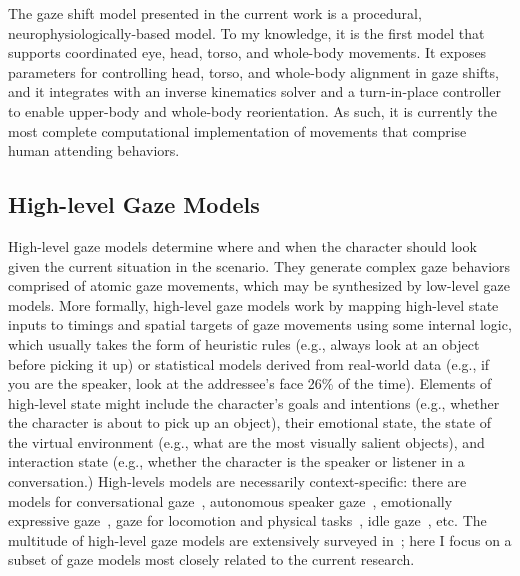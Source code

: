 The gaze shift model presented in the current work is a procedural, neurophysiologically-based model. To my knowledge, it is the first model that supports coordinated eye, head, torso, and whole-body movements. It exposes parameters for controlling head, torso, and whole-body alignment in gaze shifts, and it integrates with an inverse kinematics solver and a turn-in-place controller to enable upper-body and whole-body reorientation. As such, it is currently the most complete computational implementation of movements that comprise human attending behaviors.

\subsection{High-level Gaze Models}

High-level gaze models determine where and when the character should look given the current situation in the scenario. They generate complex gaze behaviors comprised of atomic gaze movements, which may be synthesized by low-level gaze models. More formally, high-level gaze models work by mapping high-level state inputs to timings and spatial targets of gaze movements using some internal logic, which usually takes the form of heuristic rules (e.g., always look at an object before picking it up) or statistical models derived from real-world data (e.g., if you are the speaker, look at the addressee's face 26\% of the time). Elements of high-level state might include the character's goals and intentions (e.g., whether the character is about to pick up an object), their emotional state, the state of the virtual environment (e.g., what are the most visually salient objects), and interaction state (e.g., whether the character is the speaker or listener in a conversation.) High-levels models are necessarily context-specific: there are models for conversational gaze~\citep{pelachaud2003modelling,masuko2007headeye,gratch2007rapport,andrist2013aversion,lee2007rickel}, autonomous speaker gaze~\citep{bee2010gaze,zoric2011oncreating,marsella2013virtual}, emotionally expressive gaze~\citep{queiroz2007automatic,lance2010expressive,li2012emotional}, gaze for locomotion and physical tasks~\citep{khullar2001look,mitake2007reactive,huang2016planning}, idle gaze~\citep{khullar2001look,peters2003bottomup,mitake2007reactive,peters2008applying,cafaro2009animating,grillon2009crowds,kokkinara2011modelling}, etc. The multitude of high-level gaze models are extensively surveyed in~\citep{ruhland2015gazereview}; here I focus on a subset of gaze models most closely related to the current research.

